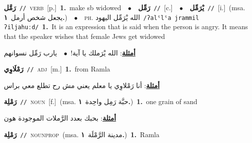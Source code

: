 \documentclass[10pt,a4paper,twoside]{article} %
\begin{document}
\begin{multicols}{2}
{\setlength\topsep{0pt}\textbf{\foreignlanguage{arabic}{رَمَّل}}\ {\color{gray}\texttt{//}\color{black}}\ \textsc{verb}\ [p.]\ \textbf{1.}~make sb widowed\ \ $\bullet$\ \ \setlength\topsep{0pt}\textbf{\foreignlanguage{arabic}{رَمِّل}}\ {\color{gray}\texttt{//}\color{black}}\ [c.]\ \ $\bullet$\ \ \setlength\topsep{0pt}\textbf{\foreignlanguage{arabic}{يْرَمِّل}}\ {\color{gray}\texttt{//}\color{black}}\ [i.]\ \color{gray}(msa. \foreignlanguage{arabic}{يجعل شخص أرمل}~\foreignlanguage{arabic}{\textbf{١.}})\color{black}\ \ $\bullet$\ \ \textsc{ph.} \color{gray} \foreignlanguage{arabic}{الله يْرَمِّل اليهود}\color{black}\ {\color{gray}\texttt{/{\sffamily ʔalˤlˤa jrammil ʔiljahuːd}/}\color{black}}\ \textbf{1.}~It is an expression that is said when the person is angry. It means that the speaker wishes that female Jews get widowed\  \begin{flushright}\color{gray}\foreignlanguage{arabic}{\textbf{\underline{\foreignlanguage{arabic}{أمثلة}}}: الله يْرَملك يا آية!\ $\bullet$\ \  يارب رَمِّل نسوانهم}\end{flushright}\color{black}} \vspace{2mm}

{\setlength\topsep{0pt}\textbf{\foreignlanguage{arabic}{رَمْلَاوِي}}\ {\color{gray}\texttt{//}\color{black}}\ \textsc{adj}\ [m.]\ \textbf{1.}~from Ramla\  \begin{flushright}\color{gray}\foreignlanguage{arabic}{\textbf{\underline{\foreignlanguage{arabic}{أمثلة}}}: أنا رَمْلاوِي يا معلم يعني مش رح تطلع معي براس}\end{flushright}\color{black}} \vspace{2mm}

{\setlength\topsep{0pt}\textbf{\foreignlanguage{arabic}{رَمْلِة}}\ {\color{gray}\texttt{//}\color{black}}\ \textsc{noun}\ [f.]\ \color{gray}(msa. \foreignlanguage{arabic}{حبَّة رَمِل واحِدة}~\foreignlanguage{arabic}{\textbf{١.}})\color{black}\ \textbf{1.}~one grain of sand\  \begin{flushright}\color{gray}\foreignlanguage{arabic}{\textbf{\underline{\foreignlanguage{arabic}{أمثلة}}}: بحبك بعدد الرَّملات الموجودة هون}\end{flushright}\color{black}} \vspace{2mm}

{\setlength\topsep{0pt}\textbf{\foreignlanguage{arabic}{رَمْلِة}}\ {\color{gray}\texttt{//}\color{black}}\ \textsc{noun\textunderscore prop}\ \color{gray}(msa. \foreignlanguage{arabic}{مدينة الرَّمْلَة}~\foreignlanguage{arabic}{\textbf{١.}})\color{black}\ \textbf{1.}~Ramla\ } \vspace{2mm}


\end{multicols}
\end{document}
